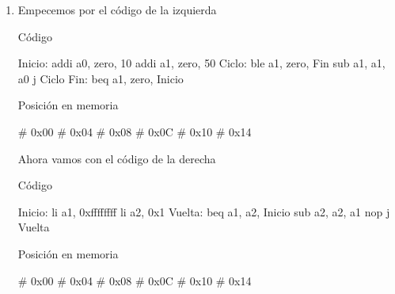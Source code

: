 \begin{enumerate}[label=\alph*)]

  \item Empecemos por el código de la izquierda

        \setlength{\columnsep}{30pt} %
        \begin{multicols}{2}
          \begin{center}
            \large{Código}
          \end{center}
          \begin{riscv}
Inicio:  addi a0, zero, 10
         addi a1, zero, 50
Ciclo:   ble a1, zero, Fin
         sub a1, a1, a0
j Ciclo
Fin: beq a1, zero, Inicio
          \end{riscv}
          \columnbreak
          \begin{center}
            \large{Posición en memoria}
          \end{center}
          \begin{riscv}
# 0x00
# 0x04
# 0x08
# 0x0C
# 0x10
# 0x14
          \end{riscv}
        \end{multicols}

        Ahora vamos con el código de la derecha

        \setlength{\columnsep}{30pt} %
        \begin{paracol}{2}
          \begin{center}
            \large{Código}
          \end{center}
          \begin{riscv}
Inicio: li a1, 0xffffffff
        li a2, 0x1
Vuelta: beq a1, a2, Inicio
        sub a2, a2, a1
nop
j Vuelta
          \end{riscv}
          \switchcolumn
          \begin{center}
            \large{Posición en memoria}
          \end{center}
          \begin{riscv}
# 0x00
# 0x04
# 0x08
# 0x0C
# 0x10
# 0x14
          \end{riscv}
        \end{paracol}

\end{enumerate}
